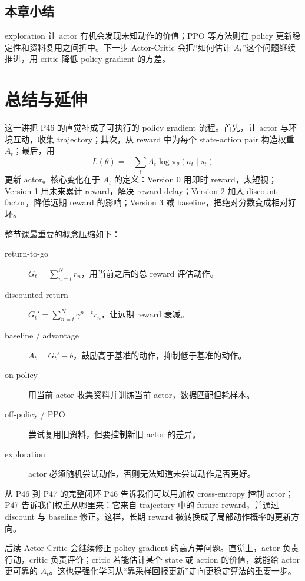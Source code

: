 \documentclass[a4paper]{article}
\begin{document}
\subsection{本章小结}

exploration 让 actor 有机会发现未知动作的价值；PPO 等方法则在 policy 更新稳定性和资料复用之间折中。下一步 Actor-Critic 会把“如何估计 $A_t$”这个问题继续推进，用 critic 降低 policy gradient 的方差。

\section{总结与延伸}

这一讲把 P46 的直觉补成了可执行的 policy gradient 流程。首先，让 actor 与环境互动，收集 trajectory；其次，从 reward 中为每个 state-action pair 构造权重 $A_t$；最后，用
\[
L(\theta)=-\sum_t A_t\log\pi_\theta(a_t\mid s_t)
\]
更新 actor。核心变化在于 $A_t$ 的定义：Version 0 用即时 reward，太短视；Version 1 用未来累计 reward，解决 reward delay；Version 2 加入 discount factor，降低远期 reward 的影响；Version 3 减 baseline，把绝对分数变成相对好坏。

整节课最重要的概念压缩如下：
\begin{description}
    \item[return-to-go] $G_t=\sum_{n=t}^{N}r_n$，用当前之后的总 reward 评估动作。
    \item[discounted return] $G_t'=\sum_{n=t}^{N}\gamma^{n-t}r_n$，让远期 reward 衰减。
    \item[baseline / advantage] $A_t=G_t'-b$，鼓励高于基准的动作，抑制低于基准的动作。
    \item[on-policy] 用当前 actor 收集资料并训练当前 actor，数据匹配但耗样本。
    \item[off-policy / PPO] 尝试复用旧资料，但要控制新旧 actor 的差异。
    \item[exploration] actor 必须随机尝试动作，否则无法知道未尝试动作是否更好。
\end{description}

\begin{importantbox}{从 P46 到 P47 的完整闭环}
    P46 告诉我们可以用加权 cross-entropy 控制 actor；P47 告诉我们权重从哪里来：它来自 trajectory 中的 future reward，并通过 discount 与 baseline 修正。这样，长期 reward 被转换成了局部动作概率的更新方向。
\end{importantbox}

后续 Actor-Critic 会继续修正 policy gradient 的高方差问题。直觉上，actor 负责行动，critic 负责评价；critic 若能估计某个 state 或 action 的价值，就能给 actor 更可靠的 $A_t$。这也是强化学习从“靠采样回报更新”走向更稳定算法的重要一步。
\end{document}
